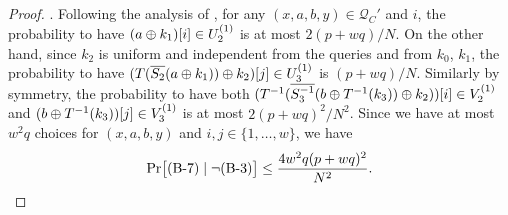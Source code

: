 \begin{proof}
%
%
%
%
%
%
%
%




\noindent \textsc{\bseven}. Following the analysis of \bsix, for any $(x,a,b,y)\in\mathcal{Q}_C'$ and $i$, the probability to have $(a\oplus k_1)[i]\in U_{2}^{(1)}$ is at most $2(p+wq)/N$. On the other hand, since $k_{2}$ is uniform and independent from the queries and from $k_{0}$, $k_{1}$, the probability to have $(T(\overline{S_2}(a \oplus k_1))\oplus k_2)[j]\in U_{3}^{(1)}$ is $(p+wq)/N$. Similarly by symmetry, the probability to have both $(T^{-1}(\overline{S_3^{-1}}(b\oplus T^{-1}(k_3))\oplus k_2))[i]\in V_2^{(1)}$ and $(b\oplus T^{-1}(k_3))[j]\in V_{3}^{(1)}$ is at most $2(p+wq)^2/N^2$. Since we have at most $w^2q$ choices for $(x,a,b,y)$ and $i, j \in\{1, \ldots, w\}$, we have
%
%
$$
{\Pr}\big[\text{(B-7)}\mid\neg\text{(B-3)}\big] \leq \frac{4w^{2} q (p+wq)^2}{N^2}.
$$
%





\end{proof}
